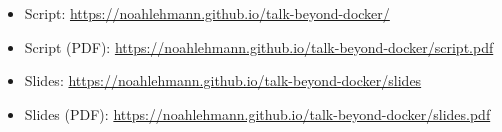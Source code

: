 \documentclass[12pt]{beamer}
\begin{document}
    \label{sec:questions}
    

    \begin{frame}
        \begin{itemize}
            \item Script: \url{https://noahlehmann.github.io/talk-beyond-docker/}
            \item Script (PDF): \url{https://noahlehmann.github.io/talk-beyond-docker/script.pdf}
            \item Slides: \url{https://noahlehmann.github.io/talk-beyond-docker/slides}
            \item Slides (PDF): \url{https://noahlehmann.github.io/talk-beyond-docker/slides.pdf}
        \end{itemize}
    \end{frame}
\end{document}
